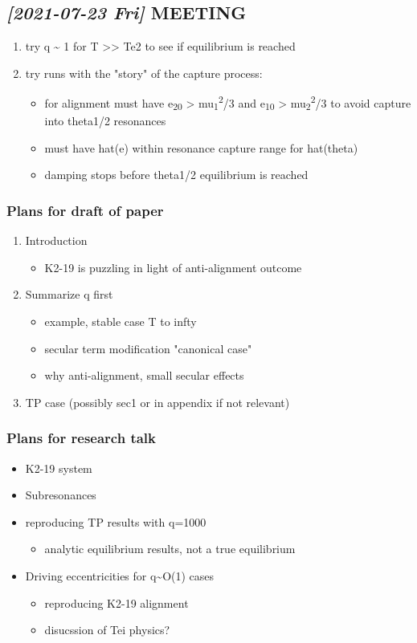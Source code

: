 \documentclass[11pt]{article}
\begin{document}
\subsection{\textit{[2021-07-23 Fri] } MEETING}
\label{sec:org24028dc}
\begin{enumerate}
\item try q \textasciitilde{} 1 for T >> Te2 to see if equilibrium is reached
\item try runs with the "story" of the capture process:
\begin{itemize}
\item for alignment must have e\textsubscript{20} > mu\textsubscript{1}\textsuperscript{2}/3 and e\textsubscript{10} > mu\textsubscript{2}\textsuperscript{2}/3 to
avoid capture into theta1/2 resonances
\item must have hat(e) within resonance capture range for hat(theta)
\item damping stops before theta1/2 equilibrium is reached
\end{itemize}
\end{enumerate}
\subsubsection{Plans for draft of paper}
\label{sec:orgc8ec857}
\begin{enumerate}
\item Introduction
\begin{itemize}
\item K2-19 is puzzling in light of anti-alignment outcome
\end{itemize}
\item Summarize q first
\begin{itemize}
\item example, stable case T to infty
\item secular term modification "canonical case"
\item why anti-alignment, small secular effects
\end{itemize}
\item TP case (possibly sec1 or in appendix if not relevant)
\end{enumerate}
\subsubsection{Plans for research talk}
\label{sec:org230fbe8}
\begin{itemize}
\item K2-19 system
\item Subresonances
\item reproducing TP results with q=1000
\begin{itemize}
\item analytic equilibrium results, not a true equilibrium
\end{itemize}
\item Driving eccentricities for q\textasciitilde{}O(1) cases
\begin{itemize}
\item reproducing K2-19 alignment
\item disucssion of Tei physics?
\end{itemize}
\end{itemize}
\end{document}
